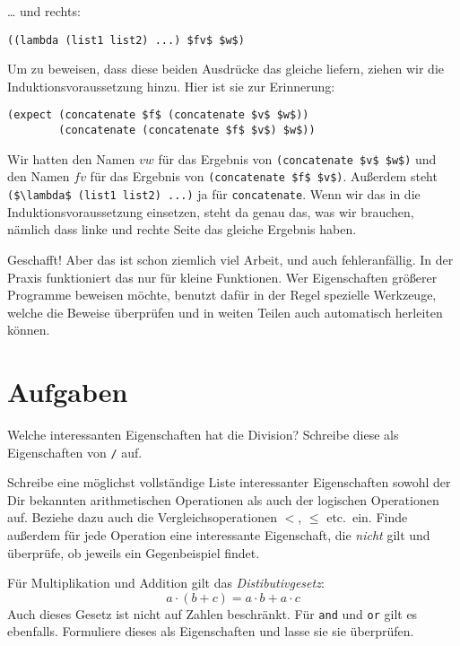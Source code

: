 \begin{enumerate}
  \ldots{} und rechts:
\begin{lstlisting}
((lambda (list1 list2) ...) $fv$ $w$)
\end{lstlisting}
  Um zu beweisen, dass diese beiden Ausdrücke das gleiche liefern,
  ziehen wir die Induktionsvoraussetzung hinzu.  Hier ist sie zur
  Erinnerung:
\begin{lstlisting}
(expect (concatenate $f$ (concatenate $v$ $w$))
        (concatenate (concatenate $f$ $v$) $w$))
\end{lstlisting}
  Wir hatten den Namen $vw$ für das Ergebnis von
  \lstinline{(concatenate $v$ $w$)} und den Namen $fv$ für das
  Ergebnis von \lstinline{(concatenate $f$ $v$)}.  Außerdem steht
  \lstinline{($\lambda$ (list1 list2) ...)} ja für
  \lstinline{concatenate}.  Wenn wir das in die
  Induktionsvoraussetzung einsetzen, steht da genau das, was wir
  brauchen, nämlich dass linke und rechte Seite das gleiche Ergebnis haben.
\end{enumerate}
%
Geschafft!  Aber das ist schon ziemlich viel Arbeit, und auch
fehleranfällig.  In der Praxis funktioniert das nur für kleine
Funktionen.  Wer Eigenschaften größerer Programme beweisen möchte,
benutzt dafür in der Regel spezielle Werkzeuge, welche die Beweise
überprüfen und in weiten Teilen auch automatisch herleiten können.

\section*{Aufgaben}

\begin{aufgabe}
Welche interessanten Eigenschaften hat die Division?  Schreibe
diese als Eigenschaften von \lstinline{/} auf.
\end{aufgabe}

\begin{aufgabe}
  Schreibe eine möglichst vollständige Liste interessanter
  Eigenschaften sowohl der Dir bekannten arithmetischen Operationen
  als auch der logischen Operationen auf.  Beziehe dazu auch die
  Vergleichsoperationen $<$, $\leq$ etc.\ ein.  Finde außerdem
  für jede Operation eine interessante Eigenschaft, die \emph{nicht}
  gilt und überprüfe, ob \drscheme{} jeweils ein Gegenbeispiel
  findet.
\end{aufgabe}

\begin{aufgabe}
  \label{aufgabe:boolean-distrib}
  Für Multiplikation und Addition gilt das
  \textit{Distibutivgesetz}:
  \begin{displaymath}
    a\cdot(b + c) = a\cdot b + a \cdot c
  \end{displaymath}
  Auch dieses Gesetz ist nicht auf Zahlen beschränkt.  Für
  \lstinline{and} und \lstinline{or} gilt es ebenfalls.  Formuliere
  dieses als Eigenschaften und lasse sie \drscheme{} sie überprüfen.
\end{aufgabe}


